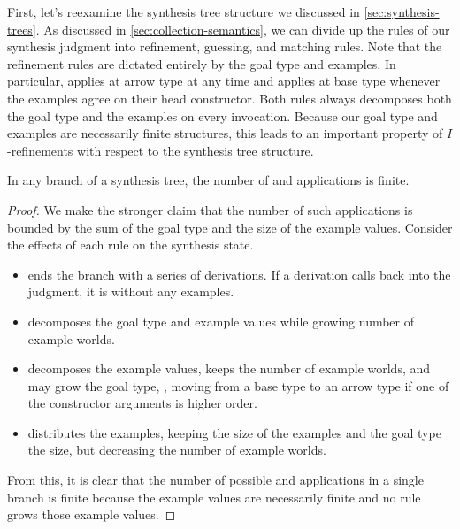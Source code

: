 First, let's reexamine the synthesis tree structure we discussed in \autoref{sec:synthesis-trees}.
As discussed in \autoref{sec:collection-semantics}, we can divide up the rules of our synthesis judgment into refinement, guessing, and matching rules.
Note that the refinement rules are dictated entirely by the goal type and examples.
In particular,  applies at arrow type at any time and  applies at base type whenever the examples agree on their head constructor.
Both rules always decomposes both the goal type and the examples on every invocation.
Because our goal type and examples are necessarily finite structures, this leads to an important property of $I$-refinements with respect to the synthesis tree structure.
\begin{lemma}
  \label{lem:finiteness-of-refinement-derivations}
  In any branch of a synthesis tree, the number of  and  applications is finite.
\end{lemma}
\begin{proof}
  We make the stronger claim that the number of such applications is bounded by the sum of the goal type and the size of the example values.
  Consider the effects of each  rule on the synthesis state.
  \begin{itemize}
    \item {} ends the branch with a series of  derivations.
      If a  derivation calls back into the  judgment, it is without any examples.
    \item {} decomposes the goal type and example values while growing number of example worlds.
    \item {} decomposes the example values, keeps the number of example worlds, and may grow the goal type, \eg, moving from a base type to an arrow type if one of the constructor arguments is higher order.
    \item {} distributes the examples, keeping the size of the examples and the goal type the size, but decreasing the number of example worlds.
  \end{itemize}
  From this, it is clear that the number of possible  and  applications in a single branch is finite because the example values are necessarily finite and no  rule grows those example values.
\end{proof}

